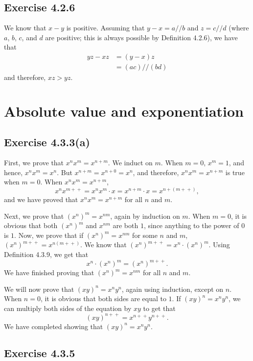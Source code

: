 \documentclass[12pt, oneside]{book}
\newcommand{\increment}{\! + \! +}
\begin{document}
	\subsection*{Exercise 4.2.6}
	
	We know that $x - y$ is positive. Assuming that $y - x = a // b$ and $z = c // d$ (where $a$, $b$, $c$, and $d$ are positive; this is always possible by Definition 4.2.6), we have that
	\[\begin{split}
		yz - xz &= (y - x)z \\
		&= (ac) // (bd)
	\end{split}\]
	and therefore, $xz > yz$.
	
	\section{Absolute value and exponentiation}
	
	\subsection*{Exercise 4.3.3(a)}
	
	First, we prove that $x^n x^m = x^{n + m}$. We induct on $m$. When $m = 0$, $x^m = 1$, and hence, $x^n x^m = x^n$. But $x^{n + m} = x^{n + 0} = x^n$, and therefore, $x^n x^m = x^{n + m}$ is true when $m = 0$. When $x^n x^m = x^{n + m}$,
	\[x^n x^{m \increment} = x^n x^m \cdot x = x^{n + m} \cdot x = x^{n + (m \increment)},\]
	and we have proved that $x^n x^m = x^{n + m}$ for all $n$ and $m$.
	
	Next, we prove that $(x^n)^m = x^{nm}$, again by induction on $m$. When $m = 0$, it is obvious that both $(x^n)^m$ and $x^{nm}$ are both $1$, since anything to the power of $0$ is $1$. Now, we prove that if $(x^n)^m = x^{nm}$ for some $n$ and $m$, $(x^n)^{m \increment} = x^{n(m \increment)}$. We know that $(x^n)^{m \increment} = x^n \cdot (x^n)^m$. Using Definition 4.3.9, we get that
	\[x^n \cdot (x^n)^m = (x^n)^{m \increment}.\]
	We have finished proving that $(x^n)^m = x^{nm}$ for all $n$ and $m$.
	
	We will now prove that $(xy)^n = x^n y^n$, again using induction, except on $n$. When $n = 0$, it is obvious that both sides are equal to $1$. If $(xy)^n = x^n y^n$, we can multiply both sides of the equation by $xy$ to get that
	\[(xy)^{n \increment} = x^{n \increment} y^{n \increment}.\]
	We have completed showing that $(xy)^n = x^n y^n$.
	
	\subsection*{Exercise 4.3.5}
	
\end{document}
